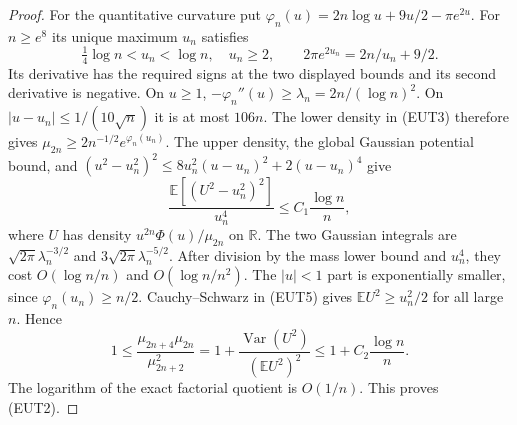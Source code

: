 \documentclass[11pt]{article}
\theoremstyle{remark}\newtheorem{remark}[theorem]{Remark}
\newcommand{\R}{\mathbb R}
\begin{document}
\begin{proof}
For the quantitative curvature put
$\varphi_n(u)=2n\log u+9u/2-\pi e^{2u}$.
For $n\ge e^8$ its unique maximum $u_n$ satisfies
\[
 \tfrac14\log n<u_n<\log n,\quad u_n\ge2,\qquad
 2\pi e^{2u_n}=2n/u_n+9/2.
\]
Its derivative has the required signs at the two displayed bounds
and its second derivative is negative.
On $u\ge1$, $-\varphi_n''(u)\ge\lambda_n=2n/(\log n)^2$.
On $|u-u_n|\le1/(10\sqrt n)$ it is at most $106n$.
The lower density in (EUT3) therefore gives
$\mu_{2n}\ge2n^{-1/2}e^{\varphi_n(u_n)}$.
The upper density, the global Gaussian potential bound, and
$(u^2-u_n^2)^2\le8u_n^2(u-u_n)^2+2(u-u_n)^4$ give
\[
 \frac{\mathbb E[(U^2-u_n^2)^2]}{u_n^4}
                    \le C_1\frac{\log n}{n},            \tag{EUT5}
\]
where $U$ has density $u^{2n}\Phi(u)/\mu_{2n}$ on $\R$.
The two Gaussian integrals are
$\sqrt{2\pi}\lambda_n^{-3/2}$ and
$3\sqrt{2\pi}\lambda_n^{-5/2}$.
After division by the mass lower bound and $u_n^4$,
they cost $O(\log n/n)$ and $O(\log n/n^2)$.
The $|u|<1$ part is exponentially smaller, since
$\varphi_n(u_n)\ge n/2$.
Cauchy--Schwarz in (EUT5) gives
$\mathbb E U^2\ge u_n^2/2$ for all large $n$. Hence
\[
 1\le\frac{\mu_{2n+4}\mu_{2n}}{\mu_{2n+2}^2}
 =1+\frac{\operatorname{Var}(U^2)}{(\mathbb E U^2)^2}
 \le1+C_2\frac{\log n}{n}.
\]
The logarithm of the exact factorial quotient is $O(1/n)$.
This proves (EUT2).
\end{proof}
\end{document}
